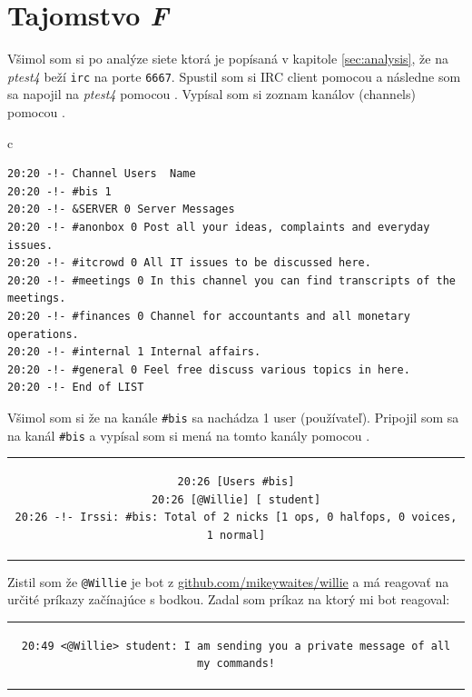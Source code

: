\documentclass[11pt,a4paper]{article}
\begin{document}
\section{Tajomstvo \textit{F}}\label{sec:F}

Všimol som si po analýze siete ktorá je popísaná v kapitole \ref{sec:analysis}, že na \textit{ptest4} beží \texttt{irc} na porte \texttt{6667}. Spustil som si IRC client pomocou  a následne som sa napojil na \textit{ptest4} pomocou . Vypísal som si zoznam kanálov (channels) pomocou .

\begin{center}
\begin{tabular}{c}
\begin{lstlisting}[basicstyle=\footnotesize]
20:20 -!- Channel Users  Name
20:20 -!- #bis 1
20:20 -!- &SERVER 0 Server Messages
20:20 -!- #anonbox 0 Post all your ideas, complaints and everyday issues.
20:20 -!- #itcrowd 0 All IT issues to be discussed here.
20:20 -!- #meetings 0 In this channel you can find transcripts of the meetings.
20:20 -!- #finances 0 Channel for accountants and all monetary operations.
20:20 -!- #internal 1 Internal affairs.
20:20 -!- #general 0 Feel free discuss various topics in here.
20:20 -!- End of LIST
\end{lstlisting}
\end{tabular}
\end{center}

Všimol som si že na kanále \texttt{\#bis} sa nachádza 1 user (používateľ). Pripojil som sa na kanál \texttt{\#bis} a vypísal som si mená na tomto kanály pomocou .

\begin{center}
\begin{tabular}{c}
\begin{lstlisting}[basicstyle=\footnotesize]
20:26 [Users #bis]
20:26 [@Willie] [ student]
20:26 -!- Irssi: #bis: Total of 2 nicks [1 ops, 0 halfops, 0 voices, 1 normal]
\end{lstlisting}
\end{tabular}
\end{center}

Zistil som že \texttt{@Willie} je bot z {\color{blue}\href{https://github.com/mikeywaites/willie}{github.com/mikeywaites/willie}} a má reagovať na určité príkazy začínajúce s bodkou. Zadal som príkaz  na ktorý mi bot reagoval:

\begin{center}
\begin{tabular}{c}
\begin{lstlisting}[basicstyle=\footnotesize]
20:49 <@Willie> student: I am sending you a private message of all my commands!
\end{lstlisting}
\end{tabular}
\end{center}
\end{document}
